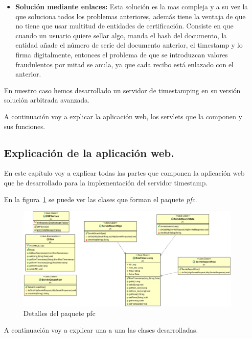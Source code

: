 \begin{itemize}
\item \textbf{Solución mediante enlaces:} Esta solución es la mas compleja y a su vez la que soluciona todos los problemas anteriores, además tiene la ventaja de que no tiene que usar multitud de entidades de certificación. Consiste en que cuando un usuario quiere sellar algo, manda el hash del documento, la entidad añade el número de serie del documento anterior, el timestamp y lo firma digitalmente, entonces el problema de que se introduzcan valores fraudulentos por mitad se anula, ya que cada recibo está enlazado con el anterior.
\end{itemize}

En nuestro caso hemos desarrollado un servidor de timestamping en su versión solución arbitrada avanzada.

A continuación voy a explicar la aplicación web, los servlets que la componen y sus funciones.

\subsection{Explicación de la aplicación web.}
En este capítulo voy a explicar todas las partes que componen la aplicación web que he desarrollado para la implementación del servidor timestamp.

En la figura~\ref{fig:paquete_pfc} se puede ver las clases que forman el paquete \textit{pfc}.

\begin{figure}
  \centering
    \includegraphics[scale=0.5]{./GoogleAppEngine/imagenes/UML_pfc.png}
  \caption{Detalles del paquete pfc}
  \label{fig:paquete_pfc}
\end{figure}

A continuación voy a explicar una a una las clases desarrolladas.

